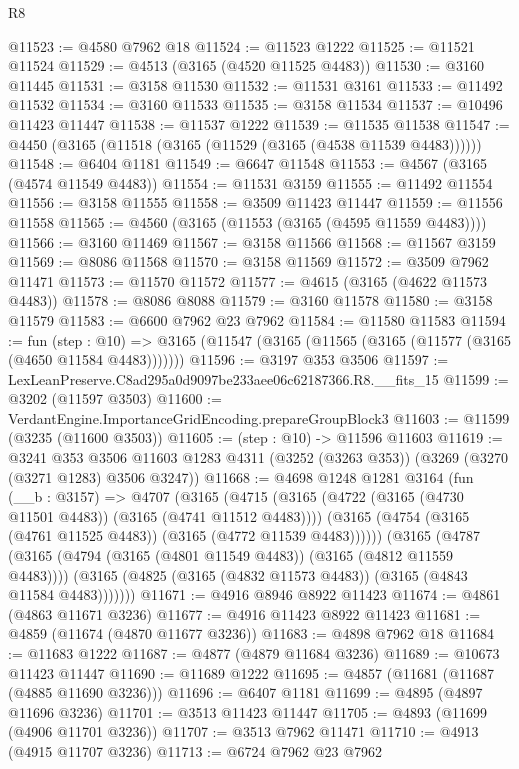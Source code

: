 \begin{lexlean}{R8}
\begin{coremodule}
@11523 := @4580 @7962 @18
@11524 := @11523 @1222
@11525 := @11521 @11524
@11529 := @4513 (@3165 (@4520 @11525 @4483))
@11530 := @3160 @11445
@11531 := @3158 @11530
@11532 := @11531 @3161
@11533 := @11492 @11532
@11534 := @3160 @11533
@11535 := @3158 @11534
@11537 := @10496 @11423 @11447
@11538 := @11537 @1222
@11539 := @11535 @11538
@11547 := @4450 (@3165 (@11518 (@3165 (@11529 (@3165 (@4538 @11539 @4483))))))
@11548 := @6404 @1181
@11549 := @6647 @11548
@11553 := @4567 (@3165 (@4574 @11549 @4483))
@11554 := @11531 @3159
@11555 := @11492 @11554
@11556 := @3158 @11555
@11558 := @3509 @11423 @11447
@11559 := @11556 @11558
@11565 := @4560 (@3165 (@11553 (@3165 (@4595 @11559 @4483))))
@11566 := @3160 @11469
@11567 := @3158 @11566
@11568 := @11567 @3159
@11569 := @8086 @11568
@11570 := @3158 @11569
@11572 := @3509 @7962 @11471
@11573 := @11570 @11572
@11577 := @4615 (@3165 (@4622 @11573 @4483))
@11578 := @8086 @8088
@11579 := @3160 @11578
@11580 := @3158 @11579
@11583 := @6600 @7962 @23 @7962
@11584 := @11580 @11583
@11594 := fun (step : @10) =>
  @3165 (@11547 (@3165 (@11565 (@3165 (@11577 (@3165 (@4650 @11584 @4483)))))))
@11596 := @3197 @353 @3506
@11597 := LexLeanPreserve.C8ad295a0d9097be233aee06c62187366.R8.__fits_15
@11599 := @3202 (@11597 @3503)
@11600 := VerdantEngine.ImportanceGridEncoding.prepareGroupBlock3
@11603 := @11599 (@3235 (@11600 @3503))
@11605 := (step : @10) -> @11596 @11603
@11619 := @3241
    @353
    @3506
    @11603
    @1283
    @4311
    (@3252 (@3263 @353))
    (@3269 (@3270 (@3271 @1283) @3506 @3247))
@11668 := @4698
    @1248
    @1281
    @3164
    (fun (__b : @3157) =>
    @4707
      (@3165
        (@4715
          (@3165 (@4722 (@3165 (@4730 @11501 @4483)) (@3165 (@4741 @11512 @4483))))
          (@3165 (@4754 (@3165 (@4761 @11525 @4483)) (@3165 (@4772 @11539 @4483))))))
      (@3165
        (@4787
          (@3165 (@4794 (@3165 (@4801 @11549 @4483)) (@3165 (@4812 @11559 @4483))))
          (@3165 (@4825 (@3165 (@4832 @11573 @4483)) (@3165 (@4843 @11584 @4483)))))))
@11671 := @4916 @8946 @8922 @11423
@11674 := @4861 (@4863 @11671 @3236)
@11677 := @4916 @11423 @8922 @11423
@11681 := @4859 (@11674 (@4870 @11677 @3236))
@11683 := @4898 @7962 @18
@11684 := @11683 @1222
@11687 := @4877 (@4879 @11684 @3236)
@11689 := @10673 @11423 @11447
@11690 := @11689 @1222
@11695 := @4857 (@11681 (@11687 (@4885 @11690 @3236)))
@11696 := @6407 @1181
@11699 := @4895 (@4897 @11696 @3236)
@11701 := @3513 @11423 @11447
@11705 := @4893 (@11699 (@4906 @11701 @3236))
@11707 := @3513 @7962 @11471
@11710 := @4913 (@4915 @11707 @3236)
@11713 := @6724 @7962 @23 @7962

\end{coremodule}
\end{lexlean}
